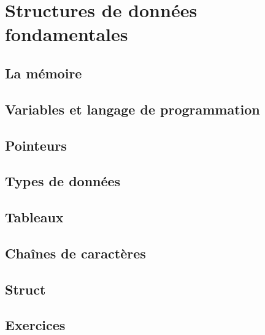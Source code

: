 \chapter{Structures de donn\'ees fondamentales}
\minitoc
\section{La mémoire}


\section{Variables et langage de programmation}
\section{Pointeurs}
\section{Types de données}
\section{Tableaux}
\section{Chaînes de caractères}
\section{Struct}

\section{Exercices}

